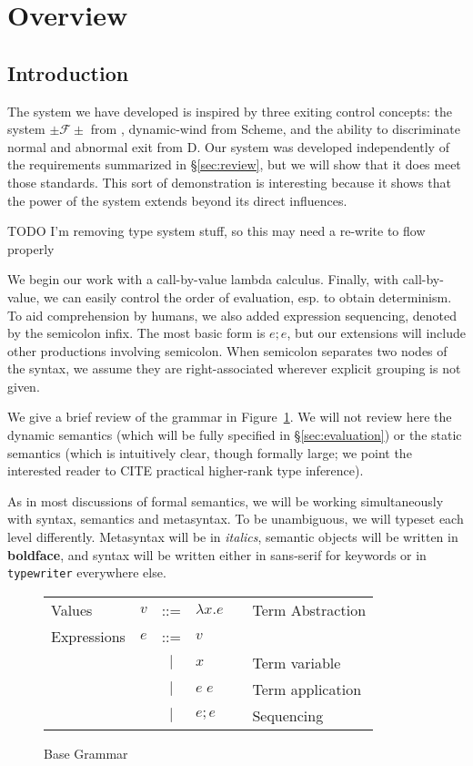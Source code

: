 \documentclass[11pt]{article}
\begin{document}
\section{Overview}
\label{system-overview}

\subsection{Introduction}

The system we have developed is inspired by three exiting control concepts: the system $\pm\mathcal{F}\pm$ from \cite{MFDC}, dynamic-wind from Scheme, and the ability to discriminate normal and abnormal exit from D.
Our system was developed independently of the requirements summarized in \S\ref{sec:review}, but we will show that it does meet those standards.
This sort of demonstration is interesting because it shows that the power of the system extends beyond its direct influences.

TODO I'm removing type system stuff, so this may need a re-write to flow properly

We begin our work with a call-by-value lambda calculus.
Finally, with call-by-value, we can easily control the order of evaluation, esp. to obtain determinism.
To aid comprehension by humans, we also added expression sequencing, denoted by the semicolon infix.
The most basic form is $e; e$, but our extensions will include other productions involving semicolon.
When semicolon separates two nodes of the syntax, we assume they are right-associated wherever explicit grouping is not given.

We give a brief review of the grammar in Figure~\ref{fig:startGrammar}.
We will not review here the dynamic semantics (which will be fully specified in \S\ref{sec:evaluation}) or the static semantics (which is intuitively clear, though formally large; we point the interested reader to CITE practical higher-rank type inference).

As in most discussions of formal semantics, we will be working simultaneously with syntax, semantics and metasyntax. To be unambiguous, we will typeset each level differently. Metasyntax will be in \textit{italics}, semantic objects will be written in \textbf{boldface}, and syntax will be written either in \textsf{sans-serif} for keywords or in \texttt{typewriter} everywhere else.

\begin{figure}[h]
\caption{Base Grammar}
\label{fig:startGrammar}

\begin{tabular}{llclll}
Values & $v$ & ::= & $\lambda x.e$ && Term Abstraction\\
Expressions & $e$ & ::= & $v$ && \\
& & $|$ & $x$ && Term variable \\
& & $|$ & $e\;e$ && Term application \\
& & $|$ & $e;e$ && Sequencing \\
\end{tabular}
\end{figure}
\end{document}
